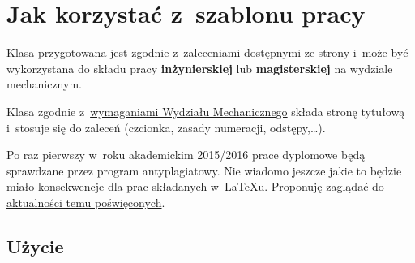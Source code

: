 
\chapter{Jak korzystać z~szablonu pracy}

Klasa przygotowana jest zgodnie z~zaleceniami dostępnymi ze strony \url{} i~może być wykorzystana do składu pracy \textbf{inżynierskiej} lub \textbf{magisterskiej} na wydziale mechanicznym.

Klasa zgodnie z~\href{http://www.wmech.pwr.wroc.pl/88428.dhtml}{wymaganiami Wydziału Mechanicznego} składa stronę tytułową i~stosuje się do zaleceń (czcionka, zasady numeracji, odstępy,\ldots).

Po raz pierwszy w~roku akademickim 2015/2016 prace dyplomowe będą sprawdzane przez program antyplagiatowy. Nie wiadomo jeszcze jakie to będzie miało konsekwencje dla prac składanych w~LaTeXu. Proponuję zaglądać do \href{http://kmim.wm.pwr.edu.pl/myszka/tag/antyplagiat/}{aktualności temu poświęconych}.

\section{Użycie}

